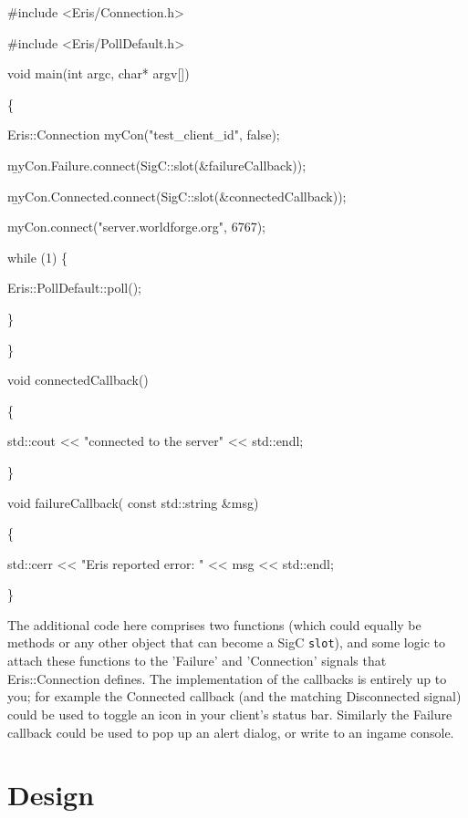 {\tt



\#include <Eris/Connection.h>

\#include <Eris/PollDefault.h>



void main(int argc, char* argv[])

\{

    Eris::Connection myCon("test\myback\_client\myback\_id", false);

    

    {\b myCon.Failure.connect(SigC::slot(\&failureCallback)); }

    {\b myCon.Connected.connect(SigC::slot(\&connectedCallback)); }

    myCon.connect("server.worldforge.org", 6767);

    

    while (1) \{

	Eris::PollDefault::poll();

    \}

\}




void connectedCallback()

\{

    std::cout << "connected to the server" << std::endl;

\}



void failureCallback( const std::string \&msg)

\{

    std::cerr << "Eris reported error: " << msg << std::endl;

\}

}



The additional code here comprises two functions (which could equally be methods
or any other object that can become a SigC {\tt slot}), and some logic to attach these
functions to the 'Failure' and 'Connection' signals that Eris::Connection defines.
The implementation of the callbacks is entirely up to you; for example the
Connected callback (and the matching Disconnected signal) could be used to toggle
an icon in your client's status bar. Similarly the Failure callback could be used to
pop up an alert dialog, or write to an ingame console.



\section{Design}



